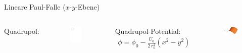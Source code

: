 \documentclass[12pt,xcolor=dvipsnames]{beamer}
\begin{document}
\begin{frame}{Lineare Paul-Falle ($x$-$y$-Ebene)}
	\begin{columns}[t]
		Quadrupol:
		\begin{figure}[h]
			\centering
			\includegraphics[width=0.8\textwidth]{./figures/lineare_paulfalle_xy_statisch_swapped.pdf}
		\end{figure}
		
		Quadrupol-Potential:
		\begin{align}
		\phi = \phi_0 - \frac{U_0}{2 \, r_0^2} (x^2-y^2)
		\end{align}
		\begin{figure}[h]
			\centering
			\includegraphics[width=0.95\textwidth]{./figures/sattelpotential2.pdf}
		\end{figure}
	\end{columns}
\end{frame}
\end{document}
